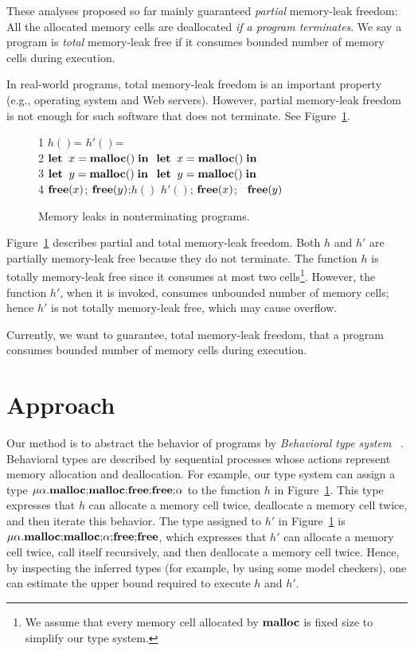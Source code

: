 \documentclass{sigplanconf}
\begin{document}
These analyses proposed so far mainly guaranteed \emph{partial}
memory-leak freedom: All the allocated memory cells are deallocated
\emph{if a program terminates}.  We say a program is \emph{total}
memory-leak free if it consumes bounded number of memory cells during
execution.

In real-world programs, total memory-leak freedom is an important
property (e.g., operating system and Web servers). However,
partial memory-leak freedom is not enough for such software that does
not terminate. See Figure~\ref{ex:np}.

\begin{exmp}\label{ex:ex1}
\begin{figure}[h]
1  \;\;$h()$= \dtb \dtb  \dtb      \dtb          \dtb $h'()$= \\
2  \dtb $\mathbf{let}\; \; x = \mathbf{malloc()}  \; \mathbf{in}\;$ \dtb \;\;\;\;$\mathbf{let}\; \; x = \mathbf{malloc()}  \; \mathbf{in}\;$\\
3  \dtb $\mathbf{let}\; \; y = \mathbf{malloc()}  \; \mathbf{in}\;$ \dtb \;\;\;\; $\mathbf{let}\; \; y = \mathbf{malloc()}  \; \mathbf{in}\;$\\
4  \dtb $\mathbf{free}(x)$; $\mathbf{free}(y) $;\;$h()$ \dtb \;\;\;\;\;\;$h'()$; $\mathbf{free}(x)$; \ $\mathbf{free}(y)$
\caption{Memory leaks in nonterminating programs.}
\label{ex:np}
\end{figure}
Figure~\ref{ex:np} describes partial and total memory-leak freedom.
Both \(h\) and \(h'\) are partially memory-leak free because they do
not terminate.  The function \(h\) is totally memory-leak free since
it consumes at most two cells\footnote{We assume that every memory
  cell allocated by \(\mathbf{malloc}\) is fixed size to simplify our type
  system.}.  However, the function \(h'\), when it is invoked,
consumes unbounded number of memory cells; hence \(h'\) is not totally
memory-leak free, which may cause overflow.
\end{exmp}

Currently, we want to guarantee, total memory-leak freedom, that a
program consumes bounded number of memory cells during execution.

\section{Approach}
Our method is to abstract the behavior of programs by \emph{Behavioral
  type
  system}~\cite{DBLP:journals/lmcs/KobayashiSW06,DBLP:journals/tcs/IgarashiK04,DBLP:conf/esop/HondaVK98}
. Behavioral types are described by sequential processes whose actions
represent memory allocation and deallocation. For example, our type
system can assign a type
\(\mu\alpha.\mathbf{malloc};\!\mathbf{malloc};\!\mathbf{free};\!\mathbf{free};\!\alpha\) to
the function \(h\) in Figure~\ref{ex:np}.  This type expresses that
\(h\) can allocate a memory cell twice, deallocate a memory cell
twice, and then iterate this behavior.  The type assigned to \(h'\) in
Figure~\ref{ex:np} is
\(\mu\alpha.\mathbf{malloc};\!\mathbf{malloc};\!\alpha;\!\mathbf{free};\!\mathbf{free}\),
which expresses that \(h'\) can allocate a memory cell twice, call
itself recursively, and then deallocate a memory cell twice.  Hence,
by inspecting the inferred types (for example, by using some model
checkers), one can estimate the upper bound required to
execute \(h\) and \(h'\).
\end{document}
